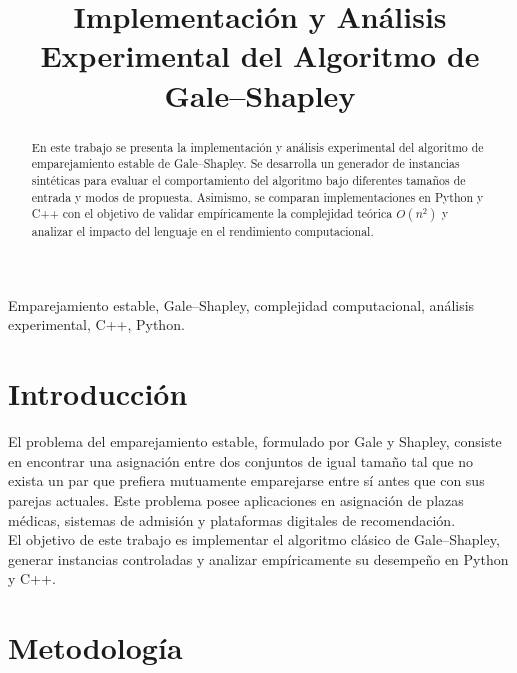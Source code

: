 \documentclass[conference]{IEEEtran}
\begin{document}
\title{Implementación y Análisis Experimental del Algoritmo de Gale--Shapley}

\author{
}

\maketitle

\begin{abstract}
En este trabajo se presenta la implementación y análisis experimental del algoritmo de emparejamiento estable de Gale--Shapley. Se desarrolla un generador de instancias sintéticas para evaluar el comportamiento del algoritmo bajo diferentes tamaños de entrada y modos de propuesta. Asimismo, se comparan implementaciones en Python y C++ con el objetivo de validar empíricamente la complejidad teórica $O(n^2)$ y analizar el impacto del lenguaje en el rendimiento computacional.
\end{abstract}\vspace{0.5cm}

\begin{IEEEkeywords}
Emparejamiento estable, Gale--Shapley, complejidad computacional, análisis experimental, C++, Python.
\end{IEEEkeywords}

\section{Introducción}

El problema del emparejamiento estable, formulado por Gale y Shapley, consiste en encontrar una asignación entre dos conjuntos de igual tamaño tal que no exista un par que prefiera mutuamente emparejarse entre sí antes que con sus parejas actuales. Este problema posee aplicaciones en asignación de plazas médicas, sistemas de admisión y plataformas digitales de recomendación.\\

\noindent El objetivo de este trabajo es implementar el algoritmo clásico de Gale--Shapley, generar instancias controladas y analizar empíricamente su desempeño en Python y C++.

\section{Metodología}
\end{document}
